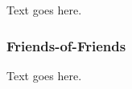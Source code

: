 Text goes here.



\subsubsection{Friends-of-Friends}
\label{subsubsec:computational_theory--halos_in_nbody_simulations--friends-of-friends}


Text goes here.




